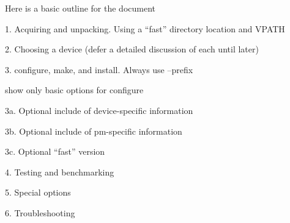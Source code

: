 \documentclass[dvipdfm,11pt]{article}
\begin{document}
Here is a basic outline for the document

1. Acquiring and unpacking.  Using a ``fast'' directory location and VPATH

2. Choosing a device (defer a detailed discussion of each until later)

3. configure, make, and install.  Always use --prefix 

show only basic options for configure

   3a. Optional include of device-specific information

   3b. Optional include of pm-specific information
 
   3c. Optional ``fast'' version

4. Testing and benchmarking

5. Special options

6. Troubleshooting
\end{document}
